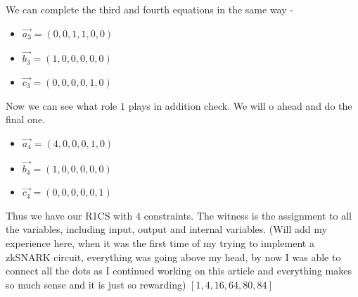 \documentclass[12pt,letterpaper]{article}
\begin{document}
We can complete the third and fourth equations in the same way - \begin{itemize}
    \item $\vec{a_3}=(0,0,1,1,0,0)$
    \item $\vec{b_3}=(1,0,0,0,0,0)$
    \item $\vec{c_3}=(0,0,0,0,1,0)$
\end{itemize}
Now we can see what role $1$ plays in addition check. We will o ahead and do the final one.
\begin{itemize}
    \item $\vec{a_4}=(4,0,0,0,1,0)$
    \item $\vec{b_4}=(1,0,0,0,0,0)$
    \item $\vec{c_4}=(0,0,0,0,0,1)$    
\end{itemize}
Thus we have our R1CS with $4$ constraints. The witness is the assignment to all the variables, including input, output and internal variables. (Will add my experience here, when it was the first time of my trying to implement a zkSNARK circuit, everything was going above my head, by now I was able to connect all the dots as I continued working on this article and everything makes so much sense and it is just so rewarding) 
$[1,4,16,64,80,84]$
\end{document}
